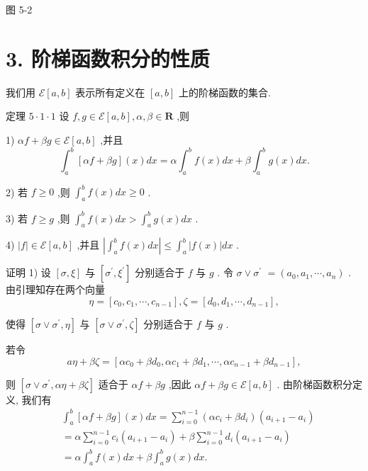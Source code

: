 图 5-2

\section*{3. 阶梯函数积分的性质}

我们用 $\mathcal{E}\left\lbrack  {a,b}\right\rbrack$ 表示所有定义在 $\left\lbrack  {a,b}\right\rbrack$ 上的阶梯函数的集合.

定理 $5 \cdot  1 \cdot  1$ 设 $f,g \in  \mathcal{E}\left\lbrack  {a,b}\right\rbrack  ,\alpha ,\beta  \in  \mathbf{R}$ ,则

1) ${\alpha f} + {\beta g} \in  \mathcal{E}\left\lbrack  {a,b}\right\rbrack$ ,并且
$${\int }_{a}^{b}\left\lbrack  {{\alpha f} + {\beta g}}\right\rbrack  \left( x\right) {dx} = \alpha {\int }_{a}^{b}f\left( x\right) {dx} + \beta {\int }_{a}^{b}g\left( x\right) {dx}.$$

2) 若 $f \geq  0$ ,则 ${\int }_{a}^{b}f\left( x\right) {dx} \geq  0$ .

3) 若 $f \geq  g$ ,则 ${\int }_{a}^{b}f\left( x\right) {dx} > {\int }_{a}^{b}g\left( x\right) {dx}$ .

4) $\left| f\right|  \in  \mathcal{E}\left\lbrack  {a,b}\right\rbrack$ ,并且 $\left| {{\int }_{a}^{b}f\left( x\right) {dx}}\right|  \leq  {\int }_{a}^{b}\left| {f\left( x\right) }\right| {dx}$ .

证明 1) 设 $\left\lbrack  {\sigma ,\xi }\right\rbrack$ 与 $\left\lbrack  {{\sigma }^{\prime },{\xi }^{\prime }}\right\rbrack$ 分别适合于 $f$ 与 $g$ . 令 $\sigma  \vee  {\sigma }^{\prime }$  $= \left( {{a}_{0},{a}_{1},\cdots ,{a}_{n}}\right)$ . 由引理知存在两个向量
$$\eta  = \left\lbrack  {{c}_{0},{c}_{1},\cdots ,{c}_{n - 1}}\right\rbrack  ,\zeta  = \left\lbrack  {{d}_{0},{d}_{1},\cdots ,{d}_{n - 1}}\right\rbrack  ,$$

使得 $\left\lbrack  {\sigma  \vee  {\sigma }^{\prime },\eta }\right\rbrack$ 与 $\left\lbrack  {\sigma  \vee  {\sigma }^{\prime },\zeta }\right\rbrack$ 分别适合于 $f$ 与 $g$ .

若令
$${a\eta } + {\beta \zeta } = \left\lbrack  {\alpha {c}_{0} + \beta {d}_{0},\alpha {c}_{1} + \beta {d}_{1},\cdots ,\alpha {c}_{n - 1} + \beta {d}_{n - 1}}\right\rbrack  ,$$

则 $\left\lbrack  {\sigma  \vee  {\sigma }^{\prime },{\alpha \eta } + {\beta \zeta }}\right\rbrack$ 适合于 ${\alpha f} + {\beta g}$ ,因此 ${\alpha f} + {\beta g} \in  \mathcal{E}\left\lbrack  {a,b}\right\rbrack$ . 由阶梯函数积分定义, 我们有
\begin{align*}
	&{\int }_{a}^{b}\left\lbrack  {{\alpha f} + {\beta g}}\right\rbrack  \left( x\right) {dx} = \mathop{\sum }\limits_{{i = 0}}^{{n - 1}}\left( {\alpha {c}_{i} + \beta {d}_{i}}\right) \left( {{a}_{i + 1} - {a}_{i}}\right)\\
	&= \alpha \mathop{\sum }\limits_{{i = 0}}^{{n - 1}}{c}_{i}\left( {{a}_{i + 1} - {a}_{i}}\right)  + \beta \mathop{\sum }\limits_{{i = 0}}^{{n - 1}}{d}_{i}\left( {{a}_{i + 1} - {a}_{i}}\right)\\
	&= \alpha {\int }_{a}^{b}f\left( x\right) {dx} + \beta {\int }_{a}^{b}g\left( x\right) {dx}.
\end{align*}

